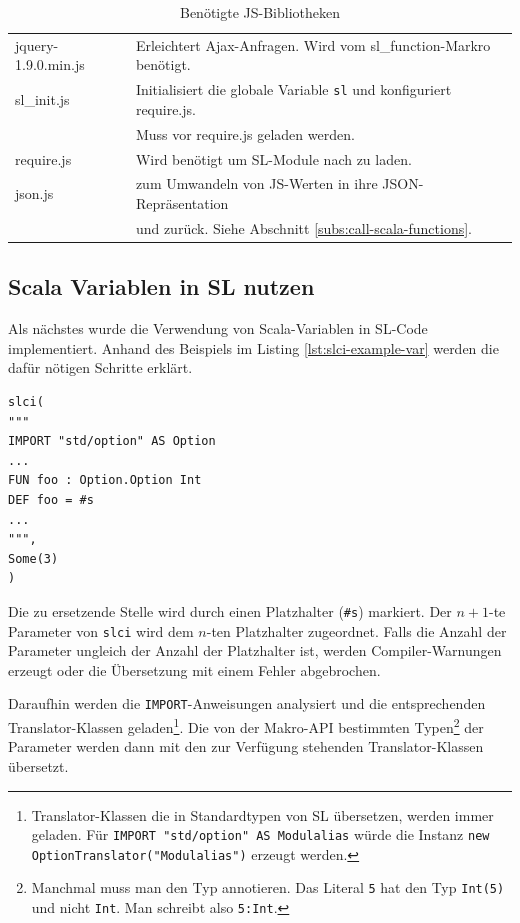 \documentclass[12pt,bibtotoc]{scrreprt}
\begin{document}
\begin{table}[h]
\caption{Benötigte JS-Bibliotheken}
\centering
\begin{tabular}{ll}
jquery-1.9.0.min.js & Erleichtert Ajax-Anfragen. Wird vom sl\_function-Markro benötigt\cite{JQuery1}.\\
sl\_init.js         & Initialisiert die globale Variable \lstinline!sl! und konfiguriert require.js. \\
                    & Muss vor require.js geladen werden.\\
require.js          & Wird benötigt um SL-Module nach zu laden\cite{RequireJS1}.\\
json.js             & zum Umwandeln von JS-Werten in ihre JSON-Repräsentation \\
                    & und zurück. Siehe Abschnitt \ref{subs:call-scala-functions}\cite{Crockford2010}.\\
\end{tabular}
\label{tab:js-libraries}
\end{table}

\subsection{Scala Variablen in SL nutzen}

Als nächstes wurde die Verwendung von Scala-Variablen in \ac{SL}-Code implementiert. Anhand des Beispiels im Listing \ref{lst:slci-example-var} werden die dafür nötigen Schritte erklärt.

\begin{lstlisting}[caption={Beispielaufruf des slci-Macros mit Scala Variablen}, label=lst:slci-example-var, float=h]
slci(
"""
IMPORT "std/option" AS Option 
...
FUN foo : Option.Option Int
DEF foo = #s
...
""",
Some(3)
)
\end{lstlisting}

Die zu ersetzende Stelle wird durch einen Platzhalter (\lstinline!#s!) markiert. Der $n+1$-te Parameter von \lstinline!slci! wird dem $n$-ten Platzhalter zugeordnet. Falls die Anzahl der Parameter ungleich der Anzahl der Platzhalter ist, werden Compiler-Warnungen erzeugt oder die Übersetzung mit einem Fehler abgebrochen. 

Daraufhin werden die \lstinline!IMPORT!-Anweisungen analysiert und die entsprechenden Translator-Klassen geladen\footnote{Translator-Klassen die in Standardtypen von SL übersetzen, werden immer geladen. Für \lstinline!IMPORT "std/option" AS Modulalias! würde die Instanz \lstinline!new OptionTranslator("Modulalias")! erzeugt werden.}.  Die von der Makro-API bestimmten Typen\footnote{Manchmal muss man den Typ annotieren. Das Literal \lstinline!5! hat den Typ \lstinline!Int(5)! und nicht \lstinline!Int!. Man schreibt also \lstinline!5:Int!.} der Parameter werden dann mit den zur Verfügung stehenden Translator-Klassen übersetzt.
\end{document}
